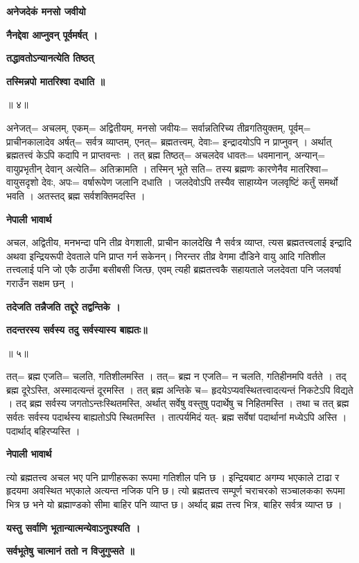 \documentclass[11pt, a5paper]{article}
\begin{document}
\textbf{अनेजदेकं मनसो जवीयो}

\textbf{नैनद्देवा आप्नुवन् पूर्वमर्षत् ।}

\textbf{तद्धावतोऽन्यानत्येति तिष्ठत्}

\textbf{तस्मिन्नपो मातरिश्वा दधाति ॥}

॥ ४॥

अनेजत्= अचलम्, एकम्= अद्वितीयम्, मनसो जवीयः= सर्वान्नतिरिच्य तीव्रगतियुक्तम्, पूर्वम्= प्राचीनकालादेव अर्षत्= सर्वत्र व्याप्तम्, एनत्= ब्रह्मतत्त्वम्, देवाः‍= इन्द्रादयोऽपि न प्राप्नुवन् । अर्थात् ब्रह्मतत्त्वं केऽपि कदापि न प्राप्तवन्तः । तत् ब्रह्म तिष्ठत्= अचलदेव धावतः= धवमानान्, अन्यान्= वायुप्रभृतीन् देवान् अत्येति‍= अतिक्रामति । तस्मिन् भूते सति= तस्य ब्रह्मणः कारणेनैव मातरिश्वा= वायुसदृशो देवः, अपः‍= वर्षारूपेण जलानि दधाति । जलदेवोऽपि तस्यैव साहाय्येन जलवृष्टिं कर्तुं समर्थो भवति । अतस्तद् ब्रह्म सर्वशक्तिमदस्ति ।

\textbf{नेपाली भावार्थ}

अचल, अद्वितीय, मनभन्दा पनि तीव्र वेगशाली, प्राचीन कालदेखि नै सर्वत्र व्याप्त, त्यस ब्रह्मतत्त्वलाई इन्द्रादि अथवा इन्द्रियरूपी देवताले पनि प्राप्त गर्न सकेनन्। निरन्तर तीव्र वेगमा दौडिने वायु आदि गतिशील तत्त्वलाई पनि जो एकै ठाउँमा बसीबसी जित्छ, एवम् त्यही ब्रह्मतत्त्वकै सहायताले जलदेवता पनि जलवर्षा गराउँन सक्षम छन् ।

\textbf{तदेजति तन्नैजति तद्दूरे तद्वन्तिके ।}

\textbf{तदन्तरस्य सर्वस्य तदु सर्वस्यास्य बाह्यतः॥}

॥ ५॥

तत्= ब्रह्म एजति= चलति, गतिशीलमस्ति । तत्= ब्रह्म न एजति= न चलति, गतिहीनमपि वर्तते । तद् ब्रह्म दूरेऽस्ति, अस्मादत्यन्तं दूरमस्ति । तत् ब्रह्म अन्तिके च= हृदयेऽप्यवस्थितत्त्वादत्यन्तं निकटेऽपि विद्यते । तद् ब्रह्म सर्वस्य जगतोऽन्तःस्थितमस्ति, अर्थात् सर्वेषु वस्तुषु पदार्थेषु च निहितमस्ति । तथा च तत् ब्रह्म सर्वतः सर्वस्य पदार्थस्य बाह्यतोऽपि स्थितमस्ति । तात्पर्यमिदं यत्-  ब्रह्म सर्वेषां पदार्थानां मध्येऽपि अस्ति । पदार्थाद् बहिरप्यस्ति ।

\textbf{नेपाली भावार्थ}

त्यो ब्रह्मतत्त्व अचल भए पनि प्राणीहरूका रूपमा गतिशील पनि छ । इन्द्रियबाट अगम्य भएकाले टाढा र हृदयमा अवस्थित भएकाले अत्यन्त नजिक पनि छ। त्यो ब्रह्मतत्त्व सम्पूर्ण चराचरको सञ्चालकका रूपमा भित्र छ भने यो ब्रह्माण्डको सीमा बाहिर पनि व्याप्त छ। अर्थाद् ब्रह्म तत्त्व भित्र, बाहिर सर्वत्र व्याप्त छ ।

\textbf{यस्तु सर्वाणि भूतान्यात्मन्येवाऽनुपश्यति ।}

\textbf{सर्वभूतेषु चात्मानं ततो न विजुगुप्सते ॥}
\end{document}
